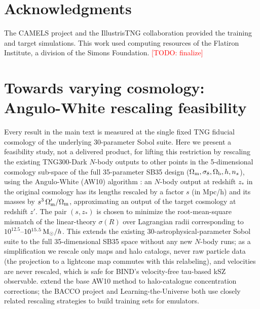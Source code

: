 \documentclass[11pt]{article}
\newcommand{\Msun}{{\rm M}_\odot}
\newcommand{\todo}[1]{\textcolor{red}{[TODO: #1]}}
\begin{document}
\section*{Acknowledgments}
The CAMELS project and the IllustrisTNG collaboration provided the training
and target simulations. This work used computing resources of the Flatiron
Institute, a division of the Simons Foundation. \todo{finalize}

\appendix
\section{Towards varying cosmology: Angulo-White rescaling feasibility}\label{sec:appendixA}

Every result in the main text is measured at the single fixed TNG fiducial
cosmology of the underlying 30-parameter Sobol suite. Here we present a
feasibility study, not a delivered product, for lifting this restriction by
rescaling the existing TNG300-Dark $N$-body outputs to other points in the
5-dimensional cosmology sub-space of the full 35-parameter SB35 design
($\Omega_{\rm m},\sigma_8,\Omega_{\rm b},h,n_s$), using the Angulo-White (AW10)
algorithm \citep{anguloWhite2010}: an $N$-body output at redshift $z_*$ in
the original cosmology has its lengths rescaled by a factor $s$ (in Mpc/h)
and its masses by $s^3\,\Omega_{\rm m}'/\Omega_{\rm m}$, approximating an
output of the target cosmology at redshift $z'$. The pair $(s,z_*)$ is
chosen to minimize the root-mean-square mismatch of the linear-theory
$\sigma(R)$ over Lagrangian radii corresponding to $10^{12.5}$--$10^{15.5}\,\Msun/h$. %
This extends the existing 30-astrophysical-parameter Sobol suite to the full
35-dimensional SB35 space without any new $N$-body runs; as a simplification
we rescale only maps and halo catalogs, never raw particle data (the
projection to a lightcone map commutes with this relabeling), and velocities
are never rescaled, which is safe for BIND's velocity-free tau-based kSZ
observable. \citet{meadPeacock2014a,meadPeacock2014b} extend the base AW10
method to halo-catalogue concentration corrections; the BACCO project
\citep{bacco2021} and Learning-the-Universe \citep{learningTheUniverse2026}
both use closely related rescaling strategies to build training sets for
emulators.
\end{document}
